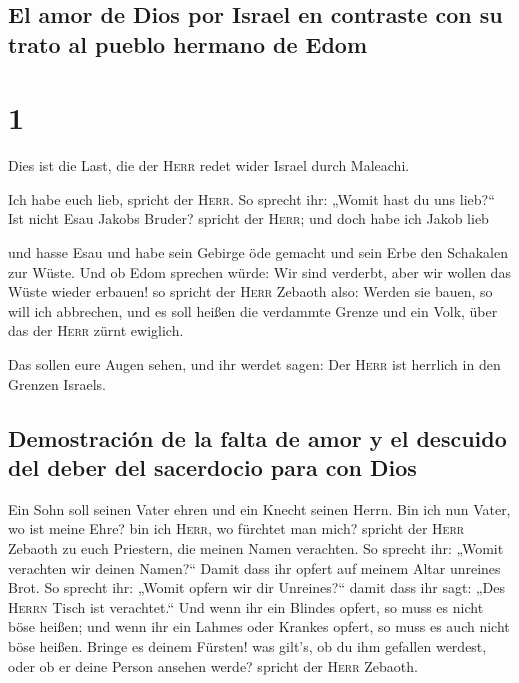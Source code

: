 \hypertarget{el-amor-de-dios-por-israel-en-contraste-con-su-trato-al-pueblo-hermano-de-edom}{%
\subsection{El amor de Dios por Israel en contraste con su trato al
pueblo hermano de
Edom}\label{el-amor-de-dios-por-israel-en-contraste-con-su-trato-al-pueblo-hermano-de-edom}}

\hypertarget{section}{%
\section{1}\label{section}}

 Dies ist die Last, die der \textsc{Herr} redet wider
Israel durch Maleachi.

 Ich habe euch lieb, spricht der \textsc{Herr}. So sprecht
ihr: „Womit hast du uns lieb?{}`` Ist nicht Esau Jakobs Bruder? spricht
der \textsc{Herr}; und doch habe ich Jakob lieb

 und hasse Esau und habe sein Gebirge öde gemacht und sein
Erbe den Schakalen zur Wüste.  Und ob Edom sprechen würde:
Wir sind verderbt, aber wir wollen das Wüste wieder erbauen! so spricht
der \textsc{Herr} Zebaoth also: Werden sie bauen, so will ich abbrechen,
und es soll heißen die verdammte Grenze und ein Volk, über das der
\textsc{Herr} zürnt ewiglich.

 Das sollen eure Augen sehen, und ihr werdet sagen: Der
\textsc{Herr} ist herrlich in den Grenzen Israels.

\hypertarget{demostraciuxf3n-de-la-falta-de-amor-y-el-descuido-del-deber-del-sacerdocio-para-con-dios}{%
\subsection{Demostración de la falta de amor y el descuido del deber del
sacerdocio para con
Dios}\label{demostraciuxf3n-de-la-falta-de-amor-y-el-descuido-del-deber-del-sacerdocio-para-con-dios}}

 Ein Sohn soll seinen Vater ehren und ein Knecht seinen
Herrn. Bin ich nun Vater, wo ist meine Ehre? bin ich \textsc{Herr}, wo
fürchtet man mich? spricht der \textsc{Herr} Zebaoth zu euch Priestern,
die meinen Namen verachten. So sprecht ihr: „Womit verachten wir deinen
Namen?{}``  Damit dass ihr opfert auf meinem Altar
unreines Brot. So sprecht ihr: „Womit opfern wir dir Unreines?{}`` damit
dass ihr sagt: „Des \textsc{Herrn} Tisch ist verachtet.`` 
Und wenn ihr ein Blindes opfert, so muss es nicht böse heißen; und wenn
ihr ein Lahmes oder Krankes opfert, so muss es auch nicht böse heißen.
Bringe es deinem Fürsten! was gilt's, ob du ihm gefallen werdest, oder
ob er deine Person ansehen werde? spricht der \textsc{Herr} Zebaoth.

